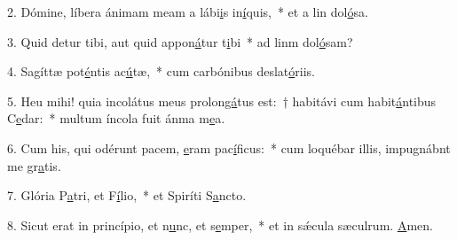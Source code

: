 2. Dómine, líbera ánimam meam a lábi\uline{i}s in\uline{í}quis,~* et a lin dol\uline{ó}sa.\par 
3. Quid detur tibi, aut quid appon\uline{á}tur t\uline{i}bi~* ad linm dol\uline{ó}sam?\par 
4. Sagíttæ pot\uline{é}ntis ac\uline{ú}tæ,~* cum carbónibus deslat\uline{ó}riis.\par 
5. Heu mihi! quia incolátus meus prolon\uline{gá}tus est:~† habitávi cum habit\uline{á}ntibus C\uline{e}dar:~* multum íncola fuit ánma m\uline{e}a.\par 
6. Cum his, qui odérunt pacem, \uline{e}ram pac\uline{í}ficus:~* cum loquébar illis, impugnábnt me gr\uline{a}tis.\par 
7. Glória P\uline{a}tri, et F\uline{í}lio,~* et Spiríti S\uline{a}ncto.\par 
8. Sicut erat in princípio, et n\uline{u}nc, et s\uline{e}mper,~* et in sǽcula sæculrum. \uline{A}men.\par 
